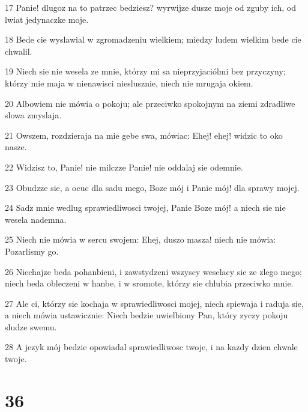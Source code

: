 \par 17 Panie! dlugoz na to patrzec bedziesz? wyrwijze dusze moje od zguby ich, od lwiat jedynaczke moje.
\par 18 Bede cie wyslawial w zgromadzeniu wielkiem; miedzy ludem wielkim bede cie chwalil.
\par 19 Niech sie nie wesela ze mnie, którzy mi sa nieprzyjaciólmi bez przyczyny; którzy mie maja w nienawisci nieslusznie, niech nie mrugaja okiem.
\par 20 Albowiem nie mówia o pokoju; ale przeciwko spokojnym na ziemi zdradliwe slowa zmyslaja.
\par 21 Owszem, rozdzieraja na mie gebe swa, mówiac: Ehej! ehej! widzic to oko nasze.
\par 22 Widzisz to, Panie! nie milczze Panie! nie oddalaj sie odemnie.
\par 23 Obudzze sie, a ocuc dla sadu mego, Boze mój i Panie mój! dla sprawy mojej.
\par 24 Sadz mnie wedlug sprawiedliwosci twojej, Panie Boze mój! a niech sie nie wesela nademna.
\par 25 Niech nie mówia w sercu swojem: Ehej, duszo masza! niech nie mówia: Pozarlismy go.
\par 26 Niechajze beda pohanbieni, i zawstydzeni wszyscy weselacy sie ze zlego mego; niech beda obleczeni w hanbe, i w sromote, którzy sie chlubia przeciwko mnie.
\par 27 Ale ci, którzy sie kochaja w sprawiedliwosci mojej, niech spiewaja i raduja sie, a niech mówia ustawicznie: Niech bedzie uwielbiony Pan, który zyczy pokoju sludze swemu.
\par 28 A jezyk mój bedzie opowiadal sprawiedliwosc twoje, i na kazdy dzien chwale twoje.

\chapter{36}

